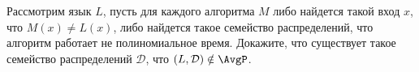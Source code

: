 Рассмотрим язык $L$, пусть для каждого алгоритма $M$ либо найдется такой вход $x$, что $M(x) \neq L(x)$,
либо найдется такое семейство распределений, что алгоритм работает не полиномиальное время. Докажите, что
существует такое семейство распределений $\mathcal{D}$, что $(L, \mathcal{D}) \notin \AvgP$.